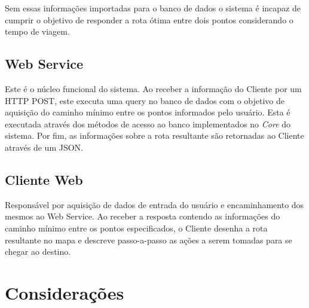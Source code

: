 Sem essas informações importadas para o banco de dados o sistema é incapaz de cumprir o objetivo de responder a rota ótima entre dois pontos considerando o tempo de viagem.


\subsection{Web Service}
Este é o núcleo funcional do sistema.
Ao receber a informação do Cliente por um HTTP POST, este executa uma query no banco de dados com o objetivo de aquisição do caminho mínimo entre os pontos informados pelo usuário. 
Esta é executada através dos métodos de acesso ao banco implementados no \emph{Core} do sistema. 
Por fim, as informações sobre a rota resultante são retornadas ao Cliente através de um JSON.

\subsection{Cliente Web}
Responsável por aquisição de dados de entrada do usuário e encaminhamento dos mesmos ao Web Service. 
Ao receber a resposta contendo as informações do caminho mínimo entre os pontos especificados, o Cliente desenha a rota resultante no mapa e descreve passo-a-passo as ações a serem tomadas para se chegar ao destino.

\section{Considerações}

